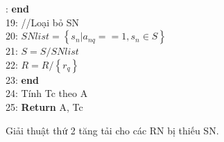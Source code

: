 \documentclass[hidelinks, 11pt, a4paper]{report}
\newenvironment{codeb}{\code}{\par}
\begin{document}
\begin{codeb}
    18: \hspace{2mm}\textbf{end}\\
    19: \hspace{2mm}//Loại bỏ SN\\
    20: \hspace{2mm}$SNlist = \left\{s_n | a_{nq} == 1, s_n \in S\right\}$\\
    21: \hspace{2mm}$S = S/SNlist$\\
    22: \hspace{2mm}$R = R/\left\{r_q\right\}$\\
    23: \textbf{end}\\
    24: Tính Tc theo A\\
    25: \textbf{Return} A, Tc\\
\end{codeb}

Giải thuật thứ 2 tăng tải cho các RN bị thiếu SN.
\end{document}
